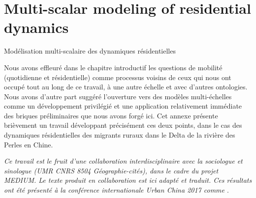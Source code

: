 

\newpage

\section{Multi-scalar modeling of residential dynamics}{Modélisation multi-scalaire des dynamiques résidentielles} %

\label{app:sec:migrationdynamics} %



Nous avons effleuré dans le chapitre introductif les questions de mobilité (quotidienne et résidentielle) comme processus voisins de ceux qui nous ont occupé tout au long de ce travail, à une autre échelle et avec d'autres ontologies. Nous avons d'autre part suggéré l'ouverture vers des modèles multi-échelles comme un développement privilégié et une application relativement immédiate des briques préliminaires que nous avons forgé ici. Cet annexe présente brièvement un travail développant précisément ces deux points, dans le cas des dynamiques résidentielles des migrants ruraux dans le Delta de la rivière des Perles en Chine.


\stars




\textit{Ce travail est le fruit d'une collaboration interdisciplinaire avec la sociologue et sinologue  (UMR CNRS 8504 Géographie-cités), dans le cadre du projet MEDIUM. Le texte produit en collaboration est ici adapté et traduit. Ces résultats ont été présenté à la conférence internationale Urban China 2017 comme \cite{losavio2017modeling}}.


\stars




